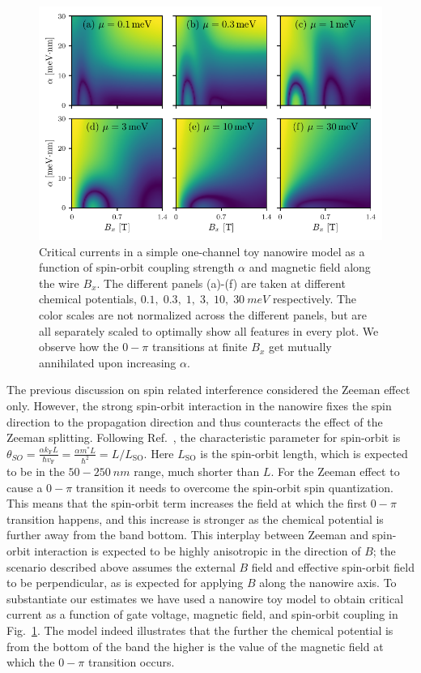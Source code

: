 \begin{figure}
\begin{center}
\centering
\includegraphics[width=0.7\columnwidth]{chapter_supercurrent/figures/sup_fig7}
\caption{Critical currents in a simple one-channel toy nanowire model\cite{Lutchyn2010,Oreg2010} as a function of spin-orbit coupling strength $\alpha$ and magnetic field along the wire $B_x$.
The different panels (a)-(f) are taken at different chemical potentials, $0.1,\; 0.3,\; 1,\; 3,\; 10,\; \SI{30}{meV}$ respectively.
The color scales are not normalized across the different panels, but are all separately scaled to optimally show all features in every plot.
We observe how the $0-\pi$ transitions at finite $B_x$ get mutually annihilated upon increasing $\alpha$.\label{fig:currents_1D_alpha_vs_B_x}}
\end{center}
\end{figure}

The previous discussion on spin related interference considered the Zeeman effect only.
However, the strong spin-orbit interaction in the nanowire fixes the spin direction to the propagation direction and thus counteracts the effect of the Zeeman splitting.
Following Ref.~\cite{Yokoyama2014}, the characteristic parameter for spin-orbit is $\theta_{SO} = \frac{\alpha k_\mathrm{F} L}{\hbar v_\mathrm{F}} = \frac{\alpha m^* L}{\hbar^2} = L/L_\mathrm{SO}$.
Here $L_\mathrm{SO}$ is the spin-orbit length, which is expected to be in the $50-\SI{250}{nm}$ range, much shorter than $L$.
For the Zeeman effect to cause a $0-\pi$ transition it needs to overcome the spin-orbit spin quantization.
This means that the spin-orbit term increases the field at which the first $0-\pi$ transition happens, and this increase is stronger as the chemical potential is further away from the band bottom.
This interplay between Zeeman and spin-orbit interaction is expected to be highly anisotropic\cite{Yokoyama2014} in the direction of $B$; the scenario described above assumes the external $B$ field and effective spin-orbit field to be perpendicular, as is expected for applying $B$ along the nanowire axis.
To substantiate our estimates we have used a nanowire toy model\cite{Lutchyn2010,Oreg2010} to obtain critical current as a function of gate voltage, magnetic field, and spin-orbit coupling in Fig.~\ref{fig:currents_1D_alpha_vs_B_x}.
The model indeed illustrates that the further the chemical potential is from the bottom of the band the higher is the value of the magnetic field at which the $0-\pi$ transition occurs.

